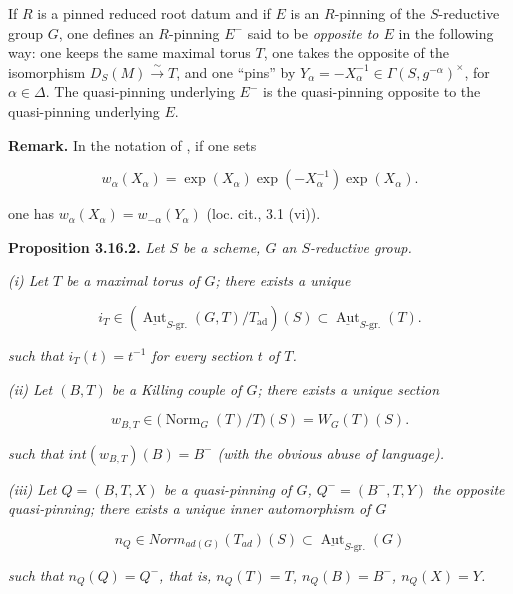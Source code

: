If \(R\) is a pinned reduced root datum and if \(E\) is an \(R\)-pinning of the \(S\)-reductive group \(G\), one defines an
\(R\)-pinning \(E^{-}\) said to be \emph{opposite to \(E\)} in the following way: one keeps the same maximal torus \(T\), one takes
the opposite of the isomorphism \(D_{S}(M) \xrightarrow{\sim} T\), and one ``pins'' by \(Y_{\alpha} = -X^{-1}_{\alpha} \in
\Gamma(S, g^{-\alpha})^{\times}\), for \(\alpha \in \Delta\). The quasi-pinning underlying \(E^{-}\) is the quasi-pinning
opposite to the quasi-pinning underlying \(E\).

\textbf{Remark.} In the notation of , if one sets

\[
  w_\alpha(X_\alpha)
  =\exp(X_\alpha)\exp(-X_\alpha^{-1})\exp(X_\alpha).
\]

one has \(w_{\alpha}(X_{\alpha}) = w_{-\alpha}(Y_{\alpha})\) (loc. cit., 3.1 (vi)).

\textbf{Proposition 3.16.2.} \emph{Let \(S\) be a scheme, \(G\) an \(S\)-reductive group.}

\emph{(i) Let \(T\) be a maximal torus of \(G\); there exists a unique}

\[
  i_T\in
  \left(
    \underline{\operatorname{Aut}}_{S\text{-}\mathrm{gr.}}(G,T)/T_{\mathrm{ad}}
  \right)(S)
  \subset
  \underline{\operatorname{Aut}}_{S\text{-}\mathrm{gr.}}(T).
\]

\emph{such that \(i_{T}(t) = t^{-1}\) for every section \(t\) of \(T\).}

\emph{(ii) Let \((B, T)\) be a Killing couple of \(G\); there exists a unique section}

\[
  w_{B,T}\in
  \bigl(\operatorname{Norm}_G(T)/T\bigr)(S)=W_G(T)(S).
\]

\emph{such that \(int(w_{B, T})(B) = B^{-}\) (with the obvious abuse of language).}

\emph{(iii) Let \(Q = (B, T, X)\) be a quasi-pinning of \(G\), \(Q^{-} = (B^{-}, T, Y)\) the opposite quasi-pinning; there exists a
unique inner automorphism of \(G\)}

\[ n_{Q} \in Norm_{ad(G)}(T_{ad})(S) \subset \underline{\operatorname{Aut}}_{S\text{-}\mathrm{gr.}}(G) \]

\emph{such that \(n_{Q}(Q) = Q^{-}\), that is, \(n_{Q}(T) = T\), \(n_{Q}(B) = B^{-}\), \(n_{Q}(X) = Y\).}

